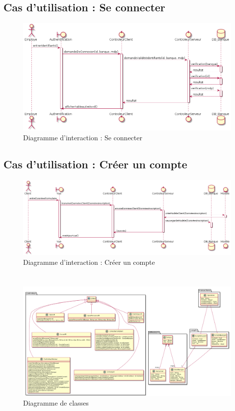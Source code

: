 \subsection{Cas d'utilisation : Se connecter}
\begin{figure}[h!]
\begin{center}
   \caption{Diagramme d'interaction : Se connecter}
   \includegraphics[scale=0.5]{images/seConnecterIR.png}
   \end{center}
\end{figure}
\subsection{Cas d'utilisation : Créer un compte}
\begin{figure}[h!]
\begin{center}
   \caption{Diagramme d'interaction : Créer un compte}
   \includegraphics[scale=0.4]{images/SInscrire.png}
   \end{center}
\end{figure}
\newpage
\section{{\color{orange}{Diagramme de classes de conception préliminaire}}}
\begin{figure}[h!]
\begin{center}
   \caption{Diagramme de classes}
   \includegraphics[scale=0.4, angle=90]{images/diagrammeClasses.png}
   \end{center}
\end{figure}
